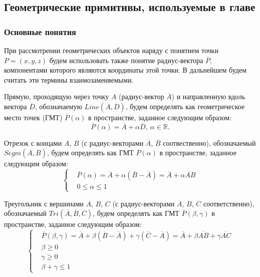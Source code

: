 \subsection{Геометрические примитивы, используемые в главе}

\subsubsection{Основные понятия}

При рассмотрении геометрических объектов наряду с понятием точки $P = (x, y, z)$ будем использовать также понятие радиус-вектора $\overline{P}$, компонентами которого являются координаты этой точки.
В дальнейшем будем считать эти термины взаимозаменяемыми.

Прямую, проходящую через точку $A$ (радиус-вектор $\overline{A}$) и направленную вдоль вектора $\overline{D}$, обозначаемую $Line(\overline{A}, \overline{D})$, будем определять как геометрическое место точек\label{term:gmt} (ГМТ\label{abbr:gmt}) $\overline{P}(\alpha)$ в пространстве, заданное следующим образом:
\begin{equation}\label{eqn:text_1_geo_prim_line}
	\overline{P}(\alpha) = \overline{A} + \alpha \overline{D}, \ \alpha \in \mathbb{R}.
\end{equation}

Отрезок с концами $A$, $B$ (с радиус-векторами $\overline{A}$, $\overline{B}$ соотвественно), обозначаемый $Segm(\overline{A}, \overline{B})$, будем определять как ГМТ $\overline{P}(\alpha)$ в пространстве, заданное следующим образом:
\begin{equation}\label{eqn:text_1_geo_prim_segment}
	\left\{
		\begin{aligned}
			& \overline{P}(\alpha) = \overline{A} + \alpha (\overline{B} - \overline{A}) = \overline{A} + \alpha \overline{AB} \\
			& 0 \le \alpha \le 1
		\end{aligned}
	\right.
\end{equation}

Треугольник с вершинами $A$, $B$, $C$ (с радиус-векторами $\overline{A}$, $\overline{B}$, $\overline{C}$ соответственно), обозначаемый $Tri(\overline{A}, \overline{B}, \overline{C})$, будем определять как ГМТ $\overline{P}(\beta, \gamma)$ в пространстве, заданное следующим образом:
\begin{equation}\label{eqn:text_1_geo_prim_triangle}
	\left\{
		\begin{aligned}
			& \overline{P}(\beta, \gamma) = \overline{A} + \beta (\overline{B} - \overline{A}) + \gamma (\overline{C} - \overline{A}) = \overline{A} + \beta \overline{AB} + \gamma \overline{AC} \\
			& \beta \ge 0 \\
			& \gamma \ge 0 \\
			& \beta + \gamma \le 1
		\end{aligned}
	\right.
\end{equation}

